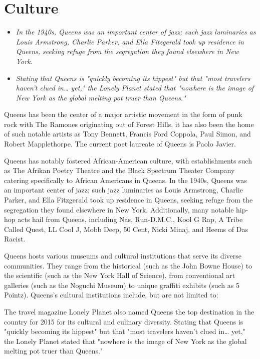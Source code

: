 \section{Culture}\label{culture}

\begin{itemize}
\item
  \emph{In the 1940s, Queens was an important center of jazz; such jazz
  luminaries as Louis Armstrong, Charlie Parker, and Ella Fitzgerald
  took up residence in Queens, seeking refuge from the segregation they
  found elsewhere in New York.}
\item
  \emph{Stating that Queens is "quickly becoming its hippest" but that
  "most travelers haven't clued in\ldots{} yet," the Lonely Planet
  stated that "nowhere is the image of New York as the global melting
  pot truer than Queens."}
\end{itemize}

Queens has been the center of a major artistic movement in the form of
punk rock with The Ramones originating out of Forest Hills, it has also
been the home of such notable artists as Tony Bennett, Francis Ford
Coppola, Paul Simon, and Robert Mapplethorpe. The current poet laureate
of Queens is Paolo Javier.

Queens has notably fostered African-American culture, with
establishments such as The Afrikan Poetry Theatre and the Black Spectrum
Theater Company catering specifically to African Americans in Queens. In
the 1940s, Queens was an important center of jazz; such jazz luminaries
as Louis Armstrong, Charlie Parker, and Ella Fitzgerald took up
residence in Queens, seeking refuge from the segregation they found
elsewhere in New York. Additionally, many notable hip-hop acts hail from
Queens, including Nas, Run-D.M.C., Kool G Rap, A Tribe Called Quest, LL
Cool J, Mobb Deep, 50 Cent, Nicki Minaj, and Heems of Das Racist.

Queens hosts various museums and cultural institutions that serve its
diverse communities. They range from the historical (such as the John
Bowne House) to the scientific (such as the New York Hall of Science),
from conventional art galleries (such as the Noguchi Museum) to unique
graffiti exhibits (such as 5 Pointz). Queens's cultural institutions
include, but are not limited to:

The travel magazine Lonely Planet also named Queens the top destination
in the country for 2015 for its cultural and culinary diversity. Stating
that Queens is "quickly becoming its hippest" but that "most travelers
haven't clued in\ldots{} yet," the Lonely Planet stated that "nowhere is
the image of New York as the global melting pot truer than Queens."

